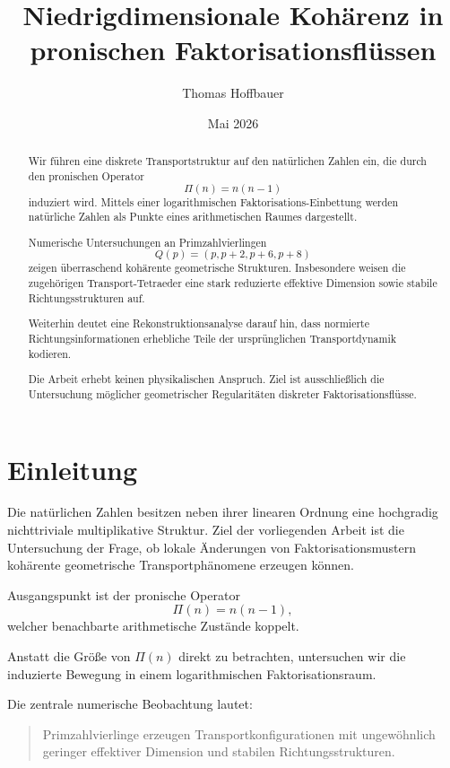 \documentclass[11pt,a4paper]{article}
\title{
	Niedrigdimensionale Kohärenz in pronischen Faktorisationsflüssen
}
\author{
	Thomas Hoffbauer
}
\date{Mai 2026}
\begin{document}
	
	\maketitle
	
	\begin{abstract}
		Wir führen eine diskrete Transportstruktur auf den natürlichen Zahlen ein, die durch den pronischen Operator
		\[
		\Pi(n)=n(n-1)
		\]
		induziert wird. Mittels einer logarithmischen Faktorisations-Einbettung werden natürliche Zahlen als Punkte eines arithmetischen Raumes dargestellt.
		
		Numerische Untersuchungen an Primzahlvierlingen
		\[
		Q(p)=(p,p+2,p+6,p+8)
		\]
		zeigen überraschend kohärente geometrische Strukturen. Insbesondere weisen die zugehörigen Transport-Tetraeder eine stark reduzierte effektive Dimension sowie stabile Richtungsstrukturen auf.
		
		Weiterhin deutet eine Rekonstruktionsanalyse darauf hin, dass normierte Richtungsinformationen erhebliche Teile der ursprünglichen Transportdynamik kodieren.
		
		Die Arbeit erhebt keinen physikalischen Anspruch. Ziel ist ausschließlich die Untersuchung möglicher geometrischer Regularitäten diskreter Faktorisationsflüsse.
	\end{abstract}
	
	\section{Einleitung}
	
	Die natürlichen Zahlen besitzen neben ihrer linearen Ordnung eine hochgradig nichttriviale multiplikative Struktur. Ziel der vorliegenden Arbeit ist die Untersuchung der Frage, ob lokale Änderungen von Faktorisationsmustern kohärente geometrische Transportphänomene erzeugen können.
	
	Ausgangspunkt ist der pronische Operator
	\[
	\Pi(n)=n(n-1),
	\]
	welcher benachbarte arithmetische Zustände koppelt.
	
	Anstatt die Größe von \(\Pi(n)\) direkt zu betrachten, untersuchen wir die induzierte Bewegung in einem logarithmischen Faktorisationsraum.
	
	Die zentrale numerische Beobachtung lautet:
	
	\begin{quote}
		Primzahlvierlinge erzeugen Transportkonfigurationen mit ungewöhnlich geringer effektiver Dimension und stabilen Richtungsstrukturen.
	\end{quote}
	
\end{document}
